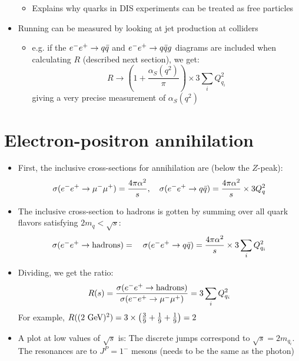 \begin{itemize}
  \begin{itemize}
    \item Explains why quarks in DIS experiments can be treated as free particles
  \end{itemize}
  \item Running can be measured by looking at jet production at colliders
  \begin{itemize}
    \item e.g. if the $e^{-}e^{+}\rightarrow q{\bar{q}}$ and $e^{-}e^{+}\rightarrow q{\bar{q}} g$ diagrams are included when calculating $R$ (described next section), we get:
    \begin{equation}
      R \rightarrow  \left(1+\frac{\alpha_S(q^2)}{\pi}\right) \times 3\sum_i Q_{q_i}^2
    \end{equation}
    giving a very precise measurement of $\alpha_S(q^2)$
  \end{itemize}
\end{itemize}

\section{Electron-positron annihilation}

\begin{itemize}
  \item First, the inclusive cross-sections for annihilation are (below the $Z$-peak):
  \begin{equation}
    \sigma(e^{-}e^{+}\rightarrow\mu^-\mu^+) = \frac{4\pi\alpha^2}{s},\quad\sigma(e^{-}e^{+}\rightarrow q{\bar{q}}) = \frac{4\pi\alpha^2}{s}\times 3Q_q^2
  \end{equation}
  \item The inclusive cross-section to hadrons is gotten by summing over all quark flavors satisfying $2m_q < \sqrt{s}$:
  \begin{equation}
    \sigma(e^{-}e^{+}\rightarrow\text{hadrons}) = \quad\sigma(e^{-}e^{+}\rightarrow q{\bar{q}}) = \frac{4\pi\alpha^2}{s}\times 3\sum_i Q_{q_i}^2
  \end{equation}
  \item Dividing, we get the ratio:
  \begin{equation}
    R(s) = \frac{\sigma(e^{-}e^{+}\rightarrow \text{hadrons})}{\sigma(e^{-}e^{+}\rightarrow \mu^-\mu^+)} = 3\sum_i Q_{q_i}^2
  \end{equation}
  For example, $R((2~\text{GeV})^2) = 3\times \left(\frac{3}{9}+\frac{1}{9}+\frac{1}{9}\right) = 2 $
  \item A plot at low values of $\sqrt s$ is:
  The discrete jumps correspond to $\sqrt s = 2m_{q_i}$. The resonances are to $J^P = 1^-$ mesons (needs to be the same as the photon)
\end{itemize}



